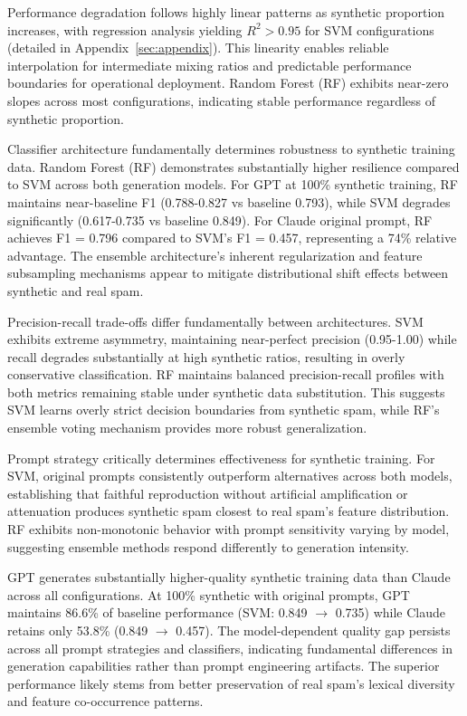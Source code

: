 Performance degradation follows highly linear patterns as synthetic proportion increases, with regression analysis yielding $R^2 > 0.95$ for SVM configurations (detailed in Appendix~\ref{sec:appendix}). This linearity enables reliable interpolation for intermediate mixing ratios and predictable performance boundaries for operational deployment. Random Forest (RF) exhibits near-zero slopes across most configurations, indicating stable performance regardless of synthetic proportion.

Classifier architecture fundamentally determines robustness to synthetic training data. Random Forest (RF) demonstrates substantially higher resilience compared to SVM across both generation models. For GPT at 100\% synthetic training, RF maintains near-baseline F1 (0.788-0.827 vs baseline 0.793), while SVM degrades significantly (0.617-0.735 vs baseline 0.849). For Claude original prompt, RF achieves F1 = 0.796 compared to SVM's F1 = 0.457, representing a 74\% relative advantage. The ensemble architecture's inherent regularization and feature subsampling mechanisms appear to mitigate distributional shift effects between synthetic and real spam.

Precision-recall trade-offs differ fundamentally between architectures. SVM exhibits extreme asymmetry, maintaining near-perfect precision (0.95-1.00) while recall degrades substantially at high synthetic ratios, resulting in overly conservative classification. RF maintains balanced precision-recall profiles with both metrics remaining stable under synthetic data substitution. This suggests SVM learns overly strict decision boundaries from synthetic spam, while RF's ensemble voting mechanism provides more robust generalization.

Prompt strategy critically determines effectiveness for synthetic training. For SVM, original prompts consistently outperform alternatives across both models, establishing that faithful reproduction without artificial amplification or attenuation produces synthetic spam closest to real spam's feature distribution. RF exhibits non-monotonic behavior with prompt sensitivity varying by model, suggesting ensemble methods respond differently to generation intensity.

GPT generates substantially higher-quality synthetic training data than Claude across all configurations. At 100\% synthetic with original prompts, GPT maintains 86.6\% of baseline performance (SVM: 0.849 $\rightarrow$ 0.735) while Claude retains only 53.8\% (0.849 $\rightarrow$ 0.457). The model-dependent quality gap persists across all prompt strategies and classifiers, indicating fundamental differences in generation capabilities rather than prompt engineering artifacts. The superior performance likely stems from better preservation of real spam's lexical diversity and feature co-occurrence patterns.


